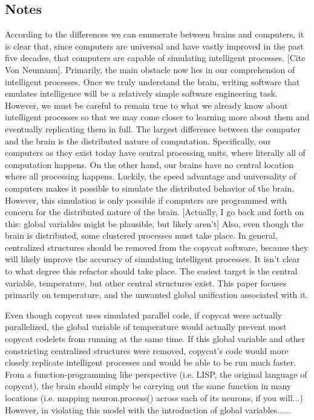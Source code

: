 \documentclass[a4paper]{article}
\begin{document}
\subsection{Notes}

    According to the differences we can enumerate between brains and computers, it is clear that, since computers are universal and have vastly improved in the past five decades, that computers are capable of simulating intelligent processes. 
    [Cite Von Neumann]. 
    Primarily, the main obstacle now lies in our comprehension of intelligent processes. 
    Once we truly understand the brain, writing software that emulates intelligence will be a relatively simple software engineering task. 
    However, we must be careful to remain true to what we already know about intelligent processes so that we may come closer to learning more about them and eventually replicating them in full. 
    The largest difference between the computer and the brain is the distributed nature of computation. 
    Specifically, our computers as they exist today have central processing units, where literally all of computation happens. 
    On the other hand, our brains have no central location where all processing happens. 
    Luckily, the speed advantage and universality of computers makes it possible to simulate the distributed behavior of the brain. 
    However, this simulation is only possible if computers are programmed with concern for the distributed nature of the brain.
    [Actually, I go back and forth on this: global variables might be plausible, but likely aren't]
    Also, even though the brain is distributed, some clustered processes must take place.
    In general, centralized structures should be removed from the copycat software, because they will likely improve the accuracy of simulating intelligent processes.
    It isn't clear to what degree this refactor should take place.
    The easiest target is the central variable, temperature, but other central structures exist.
    This paper focuses primarily on temperature, and the unwanted global unification associated with it.

    Even though copycat uses simulated parallel code, if copycat were actually parallelized, the global variable of temperature would actually prevent most copycat codelets from running at the same time.
    If this global variable and other constricting centralized structures were removed, copycat's code would more closely replicate intelligent processes and would be able to be run much faster.
    From a function-programming like perspective (i.e. LISP, the original language of copycat), the brain should simply be carrying out the same function in many locations (i.e. mapping neuron.process() across each of its neurons, if you will...)
    However, in violating this model with the introduction of global variables......
\end{document}
